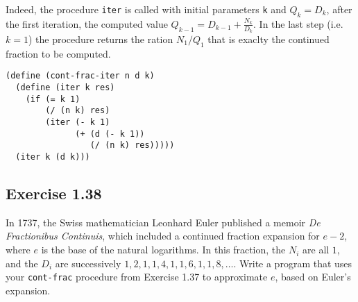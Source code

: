 \begin{itemize}
        Indeed, the procedure \texttt{iter} is called with initial parameters \texttt{k} and $ Q_{k} = D_{k} $, after the first 
        iteration, the computed value $ Q_{k - 1} = D_{k - 1} + \frac{N_{k}}{D_{k}} $.
        In the last step (i.e. $ k = 1 $) the procedure returns the ration $ N_{1} / Q_{1} $ that is exaclty the continued fraction
        to be computed.
\begin{lstlisting}
(define (cont-frac-iter n d k)
  (define (iter k res)
    (if (= k 1)
        (/ (n k) res)
        (iter (- k 1)
              (+ (d (- k 1))
                 (/ (n k) res)))))
  (iter k (d k)))
\end{lstlisting}   
\end{itemize}


\subsection*{Exercise 1.38}
In 1737, the Swiss mathematician Leonhard Euler published a memoir \textit{De Fractionibus Continuis}, which
included a continued fraction expansion for $ e - 2 $, where $ e $ is the base of the natural logarithms.
In this fraction, the $ N_{i} $ are all $ 1 $, and the $ D_{i} $ are successively $ 1, 2, 1, 1, 4, 1, 1, 6, 1, 1, 8, \dots $.
Write a program that uses your \texttt{cont-frac} procedure from Exercise 1.37 to approximate $ e $, based on Euler's expansion.

